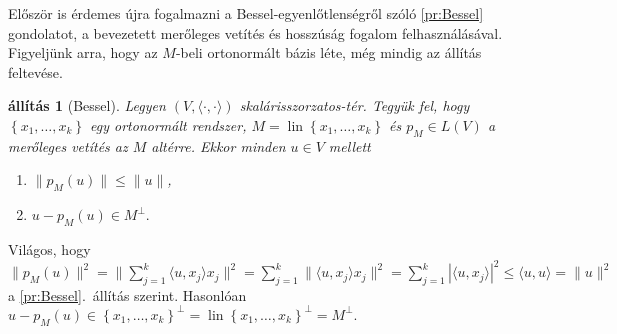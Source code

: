 \documentclass[9pt, a4paper, showtrims]{memoir}
\makeatletter
\renewenvironment{proof}[1][\proofname]
    {\par\pushQED{\qed}%
    \normalfont \topsep6\p@\@plus6\p@\relax
    \trivlist
    \item[\hskip\labelsep
        \itshape
    #1\@addpunct{:}]\ignorespaces}
    {\popQED\endtrivlist\@endpefalse}
\theoremstyle{plain}
\newtheorem{proposition}{állítás}[chapter]
\theoremstyle{remark}
\theoremstyle{definition}
\DeclareMathOperator{\lin}{lin}
\newcommand{\ip}[2]{\langle#1,#2\rangle}
\makeatother
\begin{document}
Először is érdemes újra fogalmazni a Bessel-egyenlőtlenségről szóló \ref{pr:Bessel} gondolatot,
a bevezetett merőleges vetítés és hosszúság fogalom felhasználásával.
Figyeljünk arra, hogy az $M$-beli ortonormált bázis léte, még mindig az állítás feltevése.
\begin{proposition}[Bessel]\label{pr:Bessel2}
	Legyen $\left( V,\ip{\cdot}{\cdot} \right)$ skalárisszorzatos-tér.
	Tegyük fel, hogy $\left\{ x_1,\ldots,x_k \right\}$ egy ortonormált rendszer,
	$M=\lin\left\{ x_1,\ldots,x_k \right\}$
	és $p_M\in L\left( V \right)$ a merőleges vetítés az $M$ altérre.
	Ekkor minden $u\in V$ mellett
	\begin{enumerate}
		\item
		      $\|p_M\left( u \right)\|\leq\|u\|$,
		\item
		      \(
		      u-p_M(u)\in M^\perp.
		      \)
		      \qedhere
	\end{enumerate}
\end{proposition}
\begin{proof}
	Világos, hogy
	$
		\|p_M\left( u \right)\|^2
		=
		\|\sum_{j=1}^k\ip{u}{x_j}x_j\|^2
		=
		\sum_{j=1}^k\|\ip{u}{x_j}x_j\|^2
		=
		\sum_{j=1}^k|\ip{u}{x_j}|^2
		\leq
		\ip{u}{u}
		=
		\|u\|^2
	$
	a \ref{pr:Bessel}.~állítás szerint.
	Hasonlóan
	$
		u-p_M\left( u \right)\in \left\{ x_1,\ldots,x_k \right\}^\perp
		=
		\lin\left\{ x_1,\ldots,x_k \right\}^\perp
		=
		M^\perp.
	$
\end{proof}
\end{document}
